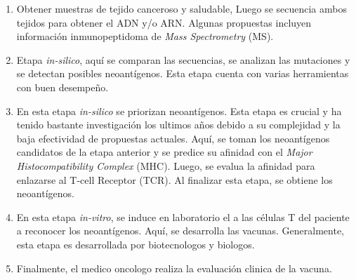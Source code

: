 \documentclass[a4paper]{article}
\begin{document}
	\begin{enumerate}
		\item Obtener muestras de tejido canceroso y saludable, Luego se secuencia ambos tejidos para obtener el ADN y/o ARN. Algunas propuestas incluyen información inmunopeptidoma de \textit{Mass Spectrometry} (MS).
		\item Etapa \textit{in-silico}, aquí  se comparan las secuencias, se analizan las mutaciones y se detectan posibles neoantígenos. Esta etapa cuenta con varias herramientas con buen desempeño.
		\item En esta etapa \textit{in-silico} se priorizan neoantígenos. Esta etapa es crucial y ha tenido bastante investigación los ultimos años debido a su complejidad y la baja efectividad de propuestas actuales. Aquí, se toman los neoantígenos candidatos de la etapa anterior y se predice su afinidad con el \textit{Major Histocompatibility Complex} (MHC). Luego, se  evalua la afinidad para enlazarse al T-cell Receptor (TCR). Al finalizar esta etapa, se obtiene los neoantígenos.
		\item En esta etapa \textit{in-vitro}, se induce en laboratorio el a las células T del paciente a reconocer los neoantígenos. Aquí, se desarrolla las vacunas. Generalmente, esta etapa es desarrollada por biotecnologos y biologos.
		\item Finalmente, el medico oncologo realiza la evaluación clinica de la vacuna.
	\end{enumerate}
	
	
	
	
\end{document}
